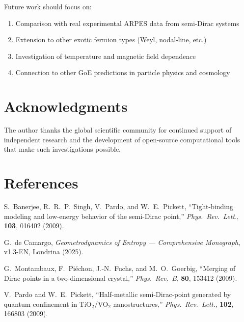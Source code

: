 \documentclass[12pt]{article}
\begin{document}
Future work should focus on:
\begin{enumerate}
    \item Comparison with real experimental ARPES data from semi-Dirac systems
    \item Extension to other exotic fermion types (Weyl, nodal-line, etc.)
    \item Investigation of temperature and magnetic field dependence
    \item Connection to other GoE predictions in particle physics and cosmology
\end{enumerate}

\section*{Acknowledgments}

The author thanks the global scientific community for continued support of independent research and the development of open-source computational tools that make such investigations possible.

\section*{References}
\begin{thebibliography}{9}
S.~Banerjee, R.~R.~P.~Singh, V.~Pardo, and W.~E.~Pickett, ``Tight-binding modeling and low-energy behavior of the semi-Dirac point,'' \emph{Phys.\ Rev.\ Lett.}, \textbf{103}, 016402 (2009).

G.~de Camargo, \emph{Geometrodynamics of Entropy — Comprehensive Monograph}, v1.3-EN, Londrina (2025).

G.~Montambaux, F.~Piéchon, J.-N.~Fuchs, and M.~O.~Goerbig, ``Merging of Dirac points in a two-dimensional crystal,'' \emph{Phys.\ Rev.\ B}, \textbf{80}, 153412 (2009).

V.~Pardo and W.~E.~Pickett, ``Half-metallic semi-Dirac-point generated by quantum confinement in TiO$_2$/VO$_2$ nanostructures,'' \emph{Phys.\ Rev.\ Lett.}, \textbf{102}, 166803 (2009).
\end{thebibliography}
\end{document}
